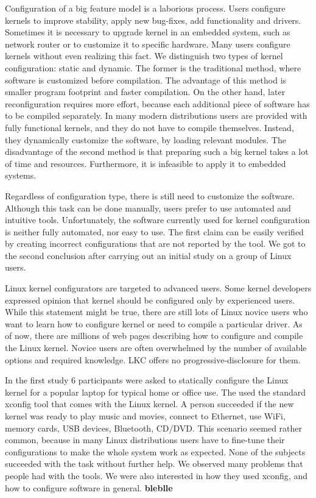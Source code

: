 \documentclass{chi2009}
\begin{document}
Configuration of a big feature model is a laborious process. Users configure kernels to improve stability, apply new bug-fixes, add functionality and drivers. Sometimes it is necessary to upgrade kernel in an embedded system, such as network router or to customize it to specific hardware. Many users configure kernels without even realizing this fact. We distinguish two types of kernel configuration: static and dynamic. The former is the traditional method, where software is customized before compilation. The advantage of this method is smaller program footprint and faster compilation. On the other hand, later reconfiguration requires more effort, because each additional piece of software has to be compiled separately. In many modern distributions users are provided with fully functional kernels, and they do not have to compile themselves. Instead, they dynamically customize the software, by loading relevant modules. The disadvantage of the second method is that preparing such a big kernel takes a lot of time and resources. Furthermore, it is infeasible to apply it to embedded systems. 

Regardless of configuration type, there is still need to customize the software. Although this task can be done manually, users prefer to use automated and intuitive tools. Unfortunately, the software currently used for kernel configuration is neither fully automated, nor easy to use. The first claim can be easily verified by creating incorrect configurations that are not reported by the tool. We got to the second conclusion after carrying out an initial study on a group of Linux users.

Linux kernel configurators are targeted to advanced users. Some kernel developers expressed opinion \cite{kernel:aunt:2002} that kernel should be configured only by experienced users. While this statement might be true, there are still lots of Linux novice users who want to learn how to configure kernel or need to compile a particular driver. As of now, there are millions of web pages describing how to configure and compile the Linux kernel. Novice users are often overwhelmed by the number of available options and required knowledge. LKC offers no progressive-disclosure for them.

In the first study 6 participants were asked to statically configure the Linux kernel for a popular laptop for typical home or office use. The used the standard \textsf{xconfig} tool that comes with the Linux kernel. A person succeeded if the new kernel was ready to play music and movies, connect to Ethernet, use WiFi, memory cards, USB devices, Bluetooth, CD/DVD. This scenario seemed rather common, because in many Linux distributions users have to fine-tune their configurations to make the whole system work as expected. None of the subjects succeeded with the task without further help. We observed many problems that people had with the tools. We were also interested in how they used \textsf{xconfig}, and how to configure software in general.  \textbf{bleblle}
\end{document}
